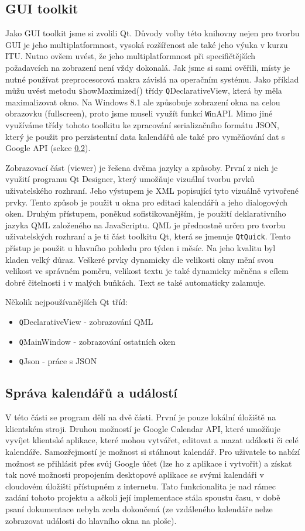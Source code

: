 \documentclass[a4paper, 12pt]{article}[7.12.2013]
\begin{document}
\subsection{GUI toolkit}
Jako GUI toolkit jsme si zvolili Qt. Důvody volby této knihovny nejen pro tvorbu GUI je jeho multiplatformnost, vysoká rozšířenost ale také jeho výuka v kurzu ITU. Nutno ovšem uvést, že jeho multiplatformnost při specifičtějších požadavcích na zobrazení není vždy dokonalá. Jak jsme si sami ověřili, místy je nutné používat preprocesorová makra závislá na operačním systému. Jako příklad můžu uvést metodu {\texttt showMaximized()} třídy {\texttt QDeclarativeView}, která by měla maximalizovat okno. Na Windows 8.1 ale způsobuje zobrazení okna na  celou obrazovku (fullscreen), proto jsme museli využít funkcí {\texttt WinAPI}. Mimo jiné využíváme třídy tohoto toolkitu ke zpracování serializačního formátu JSON, který je použit pro perzistentní data kalendářů ale také pro vyměňování dat s Google API (sekce \ref{sprava}).

Zobrazovací část (viewer) je řešena dvěma jazyky a způsoby. První z nich je využití programu Qt Designer, který umožňuje vizuální tvorbu prvků uživatelského rozhraní. Jeho výstupem je XML popisující tyto vizuálně vytvořené prvky. Tento způsob je použit u okna pro editaci kalendářů a jeho dialogových oken. Druhým přístupem, poněkud sofistikovanějším, je použití deklarativního jazyka QML založeného na JavaScriptu. QML je přednostně určen pro tvorbu uživatelských rozhraní a je ti část toolkitu Qt, která se jmenuje \texttt{QtQuick}. Tento přístup je použit u hlavního pohledu pro týden i měsíc. Na jeho kvalitu byl kladen velký důraz. Veškeré prvky dynamicky dle velikosti okny mění svou velikost ve správném poměru, velikost textu je také dynamicky měněna s cílem dobré čitelnosti i v malých buňkách. Text se také automaticky zalamuje.

Několik nejpoužívanějších Qt tříd:
\begin{itemize}
  \item {\texttt QDeclarativeView} - zobrazování QML
  \item {\texttt QMainWindow} - zobrazování ostatních oken
  \item {\texttt QJson} - práce s JSON
\end{itemize}

\subsection{Správa kalendářů a událostí} \label{sprava}
V této části se program dělí na dvě části. První je pouze lokální úložiště na klientském stroji. Druhou možností je Google Calendar API, které umožňuje vyvíjet klientské aplikace, které mohou vytvářet, editovat a mazat události či celé kalendáře. Samozřejmostí je možnost si stáhnout kalendář. Pro uživatele to nabízí možnost se přihlásit přes svůj Google účet (lze ho z aplikace i vytvořit) a získat tak nové možnosti propojením desktopové aplikace se svými kalendáři v cloudovém úložišti přístupném z internetu. Tato funkcionalita je nad rámec zadání tohoto projektu a ačkoli její implementace stála spoustu času, v době psaní dokumentace nebyla zcela dokončená (ze vzdáleného kalendáře nelze zobrazovat události do hlavního okna na ploše).
\end{document}
